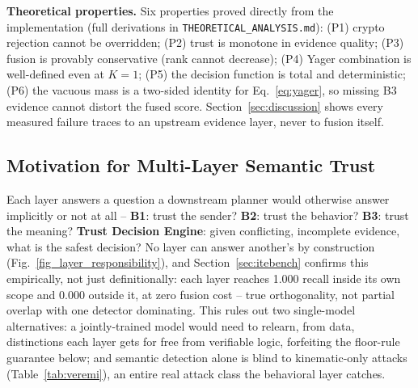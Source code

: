 \documentclass[conference]{IEEEtran}
\begin{document}
\textbf{Theoretical properties.} Six properties proved directly from the implementation (full derivations in \texttt{THEORETICAL\_ANALYSIS.md}): (P1) crypto rejection cannot be overridden; (P2) trust is monotone in evidence quality; (P3) fusion is provably conservative (rank cannot decrease); (P4) Yager combination is well-defined even at $K{=}1$; (P5) the decision function is total and deterministic; (P6) the vacuous mass is a two-sided identity for Eq.~\eqref{eq:yager}, so missing B3 evidence cannot distort the fused score. Section~\ref{sec:discussion} shows every measured failure traces to an upstream evidence layer, never to fusion itself.

\subsection{Motivation for Multi-Layer Semantic Trust}
\label{sec:novelty}
Each layer answers a question a downstream planner would otherwise answer implicitly or not at all -- \textbf{B1}: trust the sender? \textbf{B2}: trust the behavior? \textbf{B3}: trust the meaning? \textbf{Trust Decision Engine}: given conflicting, incomplete evidence, what is the safest decision? No layer can answer another's by construction (Fig.~\ref{fig_layer_responsibility}), and Section~\ref{sec:itebench} confirms this empirically, not just definitionally: each layer reaches 1.000 recall inside its own scope and 0.000 outside it, at zero fusion cost -- true orthogonality, not partial overlap with one detector dominating. This rules out two single-model alternatives: a jointly-trained model would need to relearn, from data, distinctions each layer gets for free from verifiable logic, forfeiting the floor-rule guarantee below; and semantic detection alone is blind to kinematic-only attacks (Table~\ref{tab:veremi}), an entire real attack class the behavioral layer catches.
\end{document}
